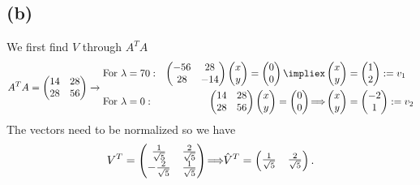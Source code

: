 \documentclass[12pt]{article}
\let\oldimplies\implies
\renewcommand*{\implies}{
	\hspace{-0.05cm}\resizebox{.95\width}{\height}{$\oldimplies$}\hspace{-0.05cm}
}
\begin{document}
		\subsection*{(b)}
			We first find $V$ through $A^{T}A$
			$$ A^{T}A = \begin{pmatrix}
				14& 28 \\ 
				28 & 56
			\end{pmatrix} \xrightarrow{} \begin{align}
				\text{For } &\lambda =70 : & \begin{pmatrix}
					-56 & 28 \\ 28 & -14
				\end{pmatrix} \begin{pmatrix}
					x \\ y
				\end{pmatrix} = \begin{pmatrix}
					0 \\ 0
				\end{pmatrix} \impliex  &\begin{pmatrix}
					x \\ y
				\end{pmatrix} = \begin{pmatrix}
					1 \\ 2
				\end{pmatrix} := v_{1} \\
				\text{For } &\lambda =0 : & \begin{pmatrix}
				14 & 28 \\ 28 & 56
				\end{pmatrix} \begin{pmatrix}
				x \\ y
				\end{pmatrix} = \begin{pmatrix}
				0 \\ 0
				\end{pmatrix} \implies  &\begin{pmatrix}
				x \\ y
				\end{pmatrix} = \begin{pmatrix}
				-2 \\ 1
				\end{pmatrix} := v_{2}
			\end{align}$$			
			The vectors need to be normalized so we have 
			$$ V^{T} = \begin{pmatrix}
				\frac{1}{\sqrt{5}} & \frac{2}{\sqrt{5}} \\
				-\frac{2}{\sqrt{5}} & \frac{1}{\sqrt{5}}
 			\end{pmatrix} \implies \hat{V}^{T} = \begin{pmatrix}
 				\frac{1}{\sqrt{5}} &\frac{2}{\sqrt{5}}
 			\end{pmatrix}.$$
\end{document}
